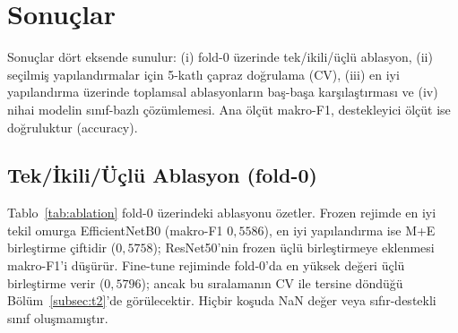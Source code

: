 \section{Sonuçlar}
\label{sec:results}

Sonuçlar dört eksende sunulur: (i) fold-0 üzerinde tek/ikili/üçlü ablasyon,
(ii) seçilmiş yapılandırmalar için 5-katlı çapraz doğrulama (CV), (iii) en iyi
yapılandırma üzerinde toplamsal ablasyonların baş-başa
karşılaştırması ve (iv) nihai modelin sınıf-bazlı çözümlemesi. Ana ölçüt
makro-F1, destekleyici ölçüt ise doğruluktur (accuracy).

\subsection{Tek/İkili/Üçlü Ablasyon (fold-0)}
\label{subsec:t1}
Tablo~\ref{tab:ablation} fold-0 üzerindeki ablasyonu özetler. Frozen rejimde en
iyi tekil omurga EfficientNetB0 (makro-F1 $0{,}5586$), en iyi yapılandırma ise
M+E birleştirme çiftidir ($0{,}5758$); ResNet50'nin frozen üçlü birleştirmeye
eklenmesi makro-F1'i düşürür. Fine-tune rejiminde fold-0'da en yüksek değeri
üçlü birleştirme verir ($0{,}5796$); ancak bu sıralamanın CV ile tersine döndüğü
Bölüm~\ref{subsec:t2}'de görülecektir. Hiçbir koşuda NaN değer veya sıfır-destekli
sınıf oluşmamıştır.

